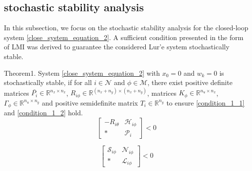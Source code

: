 \documentclass[conference]{IEEEtran}
\begin{document}
\subsection{stochastic stability analysis}
In this subsection, we focus on the stochastic stability analysis for the closed-loop system \eqref{close_system_equation_2}. A sufficient condition presented in the form of LMI was derived to guarantee the considered Lur'e system stochastically stable.

Theorem1. System \eqref{close_system_equation_2} with $x_0=0$ and $w_{k}=0$ is stochastically stable, if for all $i \in \mathcal{N}$ and $\phi \in \mathcal{M}$, there exist positive definite matrices $\bar{P_i} \in \mathbb{R}^{n_x\times n_x}$, $R_{i\phi } \in \mathbb{R}^{(n_x+n_y)\times(n_x+n_y)}$, matrices $K_{\phi} \in \mathbb{R}^{n_u\times n_x}$, $\varGamma_{\phi} \in \mathbb{R}^{n_u \times n_y}$ and positive semidefinite matrix $T_{i}\in \mathbb{R}^{n_y}$ to  ensure \eqref{condition_1_1} and \eqref{condition_1_2} hold.
\begin{equation}\label{condition_1_1}
\begin{bmatrix}
-R_{i\theta}&\mathscr{H}_{i\phi}\\
*&\mathscr{P}_{i}
\end{bmatrix}<0
\end{equation}


\begin{equation}\label{condition_1_2}
\begin{bmatrix}
\mathscr{S}_{i\phi}&\mathscr{N}_{i\phi}\\
*&\mathscr{L}_{i\phi}
\end{bmatrix}<0
\end{equation}
\end{document}
